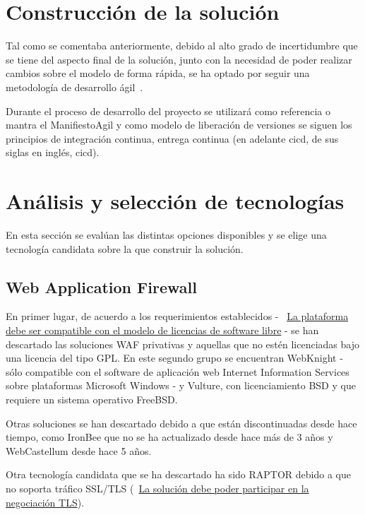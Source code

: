\section{Construcción de la solución}

\par Tal como se comentaba anteriormente, debido al alto grado de incertidumbre que se tiene del aspecto final de la solución, junto con la necesidad de poder
realizar cambios sobre el modelo de forma rápida, se ha optado por seguir una metodología de desarrollo ágil~\cite{wiki:agil}.
\par Durante el proceso de desarrollo del proyecto se utilizará como referencia o mantra el \Gls{ManifiestoAgil} y como modelo de liberación de versiones se
siguen los principios de integración continua, entrega continua (en adelante \acrshort{cicd}, de sus siglas en inglés, \acrlong{cicd}).

\section{Análisis y selección de tecnologías}
\par En esta sección se evalúan las distintas opciones disponibles y se elige una tecnología candidata sobre la que construir la solución.
\subsection{Web Application Firewall}
\par En primer lugar, de acuerdo a los requerimientos establecidos - {~\hyperref[req:softwarelibre]{La plataforma debe ser compatible con el modelo de
licencias de software libre}} - se han descartado las soluciones WAF privativas y aquellas que no estén licenciadas bajo una licencia del tipo GPL.  En
este segundo grupo se encuentran WebKnight - sólo compatible con el software de aplicación web Internet Information Services\cite{iis} sobre plataformas
Microsoft Windows - y Vulture, con licenciamiento BSD y que requiere un sistema operativo FreeBSD.

\par Otras soluciones se han descartado debido a que están discontinuadas desde hace tiempo, como IronBee que no se ha actualizado desde hace más de 3 años
y WebCastellum desde hace 5 años.

\par Otra tecnología candidata que se ha descartado ha sido RAPTOR debido a que no soporta tráfico SSL/TLS ({~\hyperref[req:tls]{La solución debe poder
participar en la negociación TLS}}).

